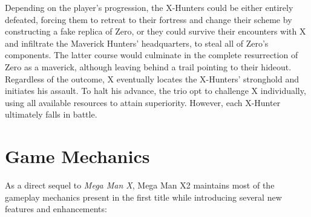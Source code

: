 Depending on the player's progression, the X-Hunters could be either entirely defeated, forcing them to retreat to their fortress and change their scheme by constructing a fake replica of Zero, or they could survive their encounters with X and infiltrate the Maverick Hunters' headquarters, to steal all of Zero's components. The latter course would culminate in the complete resurrection of Zero as a maverick, although leaving behind a trail pointing to their hideout. Regardless of the outcome, X eventually locates the X-Hunters' stronghold and initiates his assault. To halt his advance, the trio opt to challenge X individually, using all available resources to attain superiority. However, each X-Hunter ultimately falls in battle.


\section{Game Mechanics}
As a direct sequel to \emph{Mega Man X}, Mega Man X2 maintains most of the gameplay mechanics present in the first title while introducing several new features and enhancements:
